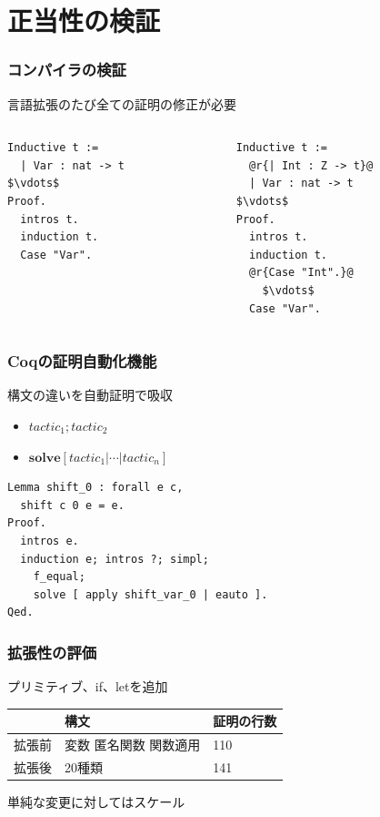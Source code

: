 \documentclass[dvipdfmx,cjk,xcolor=dvipsnames,envcountsect,notheorems,12pt]{beamer}
\theoremstyle{definition}
\newcommand{\keyword}[1]{\mathbf{#1}}
\begin{document}
\section{正当性の検証}

\begin{frame}[fragile]
	\frametitle{コンパイラの検証}
	\Large 言語拡張のたび全ての証明の修正が必要
	\begin{columns}
		\begin{column}{0.5\textwidth}
\begin{lstlisting}[frame=none]
Inductive t :=
  | Var : nat -> t
$\vdots$
Proof.
  intros t.
  induction t.
  Case "Var".
\end{lstlisting}
		\end{column}
		\begin{column}{0.5\textwidth}
\begin{lstlisting}[frame=none]
Inductive t :=
  @r{| Int : Z -> t}@
  | Var : nat -> t
$\vdots$
Proof.
  intros t.
  induction t.
  @r{Case "Int".}@
    $\vdots$
  Case "Var".
\end{lstlisting}
		\end{column}
	\end{columns}
\end{frame}

\begin{frame}[fragile]
	\frametitle{Coqの証明自動化機能}
	\LARGE 構文の違いを自動証明で吸収
	\begin{center}
		\footnotesize
		\begin{itemize}
			\item $\mathit{tactic}_1;\mathit{tactic}_2$
			\item $\keyword{solve} [\mathit{tactic}_1 | \cdots | \mathit{tactic}_n]$
		\end{itemize}
	\end{center}

	\vfill

\begin{lstlisting}[]
Lemma shift_0 : forall e c,
  shift c 0 e = e.
Proof.
  intros e.
  induction e; intros ?; simpl;
    f_equal;
    solve [ apply shift_var_0 | eauto ].
Qed.
\end{lstlisting}
\end{frame}

\begin{frame}
	\frametitle{拡張性の評価}
	\LARGE プリミティブ、if、letを追加
	\begin{center}
		\large
		\begin{tabular}{l|ll}
			 & 構文 & 証明の行数 \\
			\hline
			拡張前 & 変数 匿名関数 関数適用 & 110 \\
			拡張後 & 20種類 & 141 \\
		\end{tabular}
	\end{center}

	\vfill

	単純な変更に対してはスケール
\end{frame}
\end{document}
